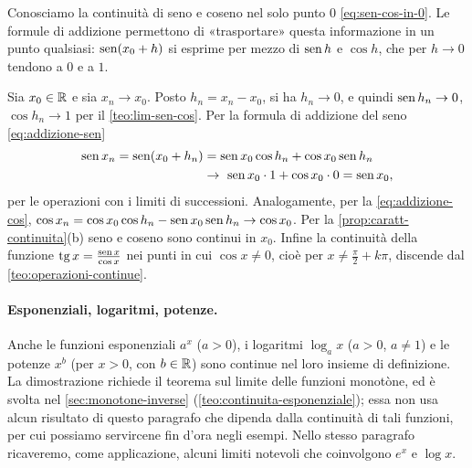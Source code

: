 \begin{schema}
\end{schema}

\begin{strategia}
Conosciamo la continuità di seno e coseno nel solo punto $0$ \eqref{eq:sen-cos-in-0}. Le
formule di addizione permettono di «trasportare» questa informazione in un punto
qualsiasi: $\operatorname{sen}(x_{0}+h)$ si esprime per mezzo di $\operatorname{sen} h$ e $\cos h$, che per $h\to0$
tendono a $0$ e a $1$.
\end{strategia}

\begin{dimostrazione}
Sia $x_{0}\in\mathbb{R}$ e sia $x_{n}\to x_{0}$. Posto $h_{n}=x_{n}-x_{0}$, si ha $h_{n}\to0$, e
quindi $\operatorname{sen} h_{n}\to0$, $\cos h_{n}\to1$ per il \cref{teo:lim-sen-cos}. Per la formula
di addizione del seno \eqref{eq:addizione-sen}
\begin{equation}\label{eq:sen-continuo}
\begin{split}
  \operatorname{sen} x_{n}=\operatorname{sen}(x_{0}+h_{n})&=\operatorname{sen} x_{0}\cos h_{n}+\cos x_{0}\operatorname{sen} h_{n}\\
  &\to\ \operatorname{sen} x_{0}\cdot1+\cos x_{0}\cdot0=\operatorname{sen} x_{0},
\end{split}
\end{equation}
per le operazioni con i limiti di successioni. Analogamente, per la
\eqref{eq:addizione-cos}, $\cos x_{n}=\cos x_{0}\cos h_{n}-\operatorname{sen} x_{0}\operatorname{sen} h_{n}\to\cos x_{0}$.
Per la \cref{prop:caratt-continuita}(b) seno e coseno sono continui in $x_{0}$. Infine la
continuità della funzione $\operatorname{tg} x=\frac{\operatorname{sen} x}{\cos x}$ nei punti in cui $\cos x\neq0$,
cioè per $x\neq\frac\pi2+k\pi$, discende dal \cref{teo:operazioni-continue}.
\end{dimostrazione}

\paragraph{Esponenziali, logaritmi, potenze.} Anche le funzioni esponenziali $a^{x}$
($a>0$), i logaritmi $\log_{a}x$ ($a>0$, $a\neq1$) e le potenze $x^{b}$ (per $x>0$, con
$b\in\mathbb{R}$) sono continue nel loro insieme di definizione. La dimostrazione richiede il
teorema sul limite delle funzioni monotòne, ed è svolta nel \cref{sec:monotone-inverse}
(\cref{teo:continuita-esponenziale}); essa non usa alcun risultato di questo paragrafo
che dipenda dalla continuità di tali funzioni, per cui possiamo servircene fin d'ora
negli esempi. Nello stesso paragrafo ricaveremo, come applicazione, alcuni limiti
notevoli che coinvolgono $e^{x}$ e $\log x$.

